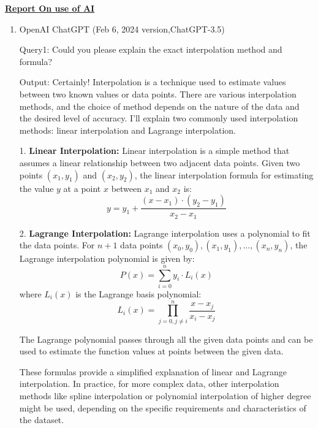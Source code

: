 \newpage
\thispagestyle{nopagenum}
\begin{center} %
\textbf{ %
\underline{ %
\large{Report On use of AI}
}} %
\end{center} %
\begin{enumerate}
\item OpenAI ChatGPT (Feb 6, 2024 version,ChatGPT-3.5)

Query1: Could you please explain the exact interpolation method and formula?

Output: Certainly! Interpolation is a technique used to estimate values between two known values or data points. There are various interpolation methods, and the choice of method depends on the nature of the data and the desired level of accuracy. I'll explain two commonly used interpolation methods: linear interpolation and Lagrange interpolation.

1. \textbf{Linear Interpolation:}
   Linear interpolation is a simple method that assumes a linear relationship between two adjacent data points. Given two points \((x_1, y_1)\) and \((x_2, y_2)\), the linear interpolation formula for estimating the value \(y\) at a point \(x\) between \(x_1\) and \(x_2\) is:
   \[ y = y_1 + \frac{{(x - x_1) \cdot (y_2 - y_1)}}{{x_2 - x_1}} \]

2. \textbf{Lagrange Interpolation:}
   Lagrange interpolation uses a polynomial to fit the data points. For \(n+1\) data points \((x_0, y_0), (x_1, y_1), \ldots, (x_n, y_n)\), the Lagrange interpolation polynomial is given by:
   \[ P(x) = \sum_{i=0}^{n} y_i \cdot L_i(x) \]
   where \(L_i(x)\) is the Lagrange basis polynomial:
   \[ L_i(x) = \prod_{j=0, j \neq i}^{n} \frac{{x - x_j}}{{x_i - x_j}} \]

   The Lagrange polynomial passes through all the given data points and can be used to estimate the function values at points between the given data.

These formulas provide a simplified explanation of linear and Lagrange interpolation. In practice, for more complex data, other interpolation methods like spline interpolation or polynomial interpolation of higher degree might be used, depending on the specific requirements and characteristics of the dataset.



\end{enumerate}

